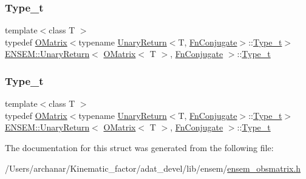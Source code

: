 \subsubsection{\texorpdfstring{Type\_t}{Type\_t}\hspace{0.1cm}{\footnotesize\ttfamily [1/2]}}
{\footnotesize\ttfamily template$<$class T $>$ \\
typedef \mbox{\hyperlink{classENSEM_1_1OMatrix}{O\+Matrix}}$<$typename \mbox{\hyperlink{structENSEM_1_1UnaryReturn}{Unary\+Return}}$<$T, \mbox{\hyperlink{structENSEM_1_1FnConjugate}{Fn\+Conjugate}}$>$\+::\mbox{\hyperlink{structENSEM_1_1UnaryReturn_3_01OMatrix_3_01T_01_4_00_01FnConjugate_01_4_ac5de4bf0142b30100d4ade43fc2817d8}{Type\+\_\+t}}$>$ \mbox{\hyperlink{structENSEM_1_1UnaryReturn}{E\+N\+S\+E\+M\+::\+Unary\+Return}}$<$ \mbox{\hyperlink{classENSEM_1_1OMatrix}{O\+Matrix}}$<$ T $>$, \mbox{\hyperlink{structENSEM_1_1FnConjugate}{Fn\+Conjugate}} $>$\+::\mbox{\hyperlink{structENSEM_1_1UnaryReturn_3_01OMatrix_3_01T_01_4_00_01FnConjugate_01_4_ac5de4bf0142b30100d4ade43fc2817d8}{Type\+\_\+t}}}

\mbox{\label{structENSEM_1_1UnaryReturn_3_01OMatrix_3_01T_01_4_00_01FnConjugate_01_4_ac5de4bf0142b30100d4ade43fc2817d8}} 
\subsubsection{\texorpdfstring{Type\_t}{Type\_t}\hspace{0.1cm}{\footnotesize\ttfamily [2/2]}}
{\footnotesize\ttfamily template$<$class T $>$ \\
typedef \mbox{\hyperlink{classENSEM_1_1OMatrix}{O\+Matrix}}$<$typename \mbox{\hyperlink{structENSEM_1_1UnaryReturn}{Unary\+Return}}$<$T, \mbox{\hyperlink{structENSEM_1_1FnConjugate}{Fn\+Conjugate}}$>$\+::\mbox{\hyperlink{structENSEM_1_1UnaryReturn_3_01OMatrix_3_01T_01_4_00_01FnConjugate_01_4_ac5de4bf0142b30100d4ade43fc2817d8}{Type\+\_\+t}}$>$ \mbox{\hyperlink{structENSEM_1_1UnaryReturn}{E\+N\+S\+E\+M\+::\+Unary\+Return}}$<$ \mbox{\hyperlink{classENSEM_1_1OMatrix}{O\+Matrix}}$<$ T $>$, \mbox{\hyperlink{structENSEM_1_1FnConjugate}{Fn\+Conjugate}} $>$\+::\mbox{\hyperlink{structENSEM_1_1UnaryReturn_3_01OMatrix_3_01T_01_4_00_01FnConjugate_01_4_ac5de4bf0142b30100d4ade43fc2817d8}{Type\+\_\+t}}}



The documentation for this struct was generated from the following file\+:\begin{DoxyCompactItemize}
\item 
/\+Users/archanar/\+Kinematic\+\_\+factor/adat\+\_\+devel/lib/ensem/\mbox{\hyperlink{lib_2ensem_2ensem__obsmatrix_8h}{ensem\+\_\+obsmatrix.\+h}}\end{DoxyCompactItemize}
